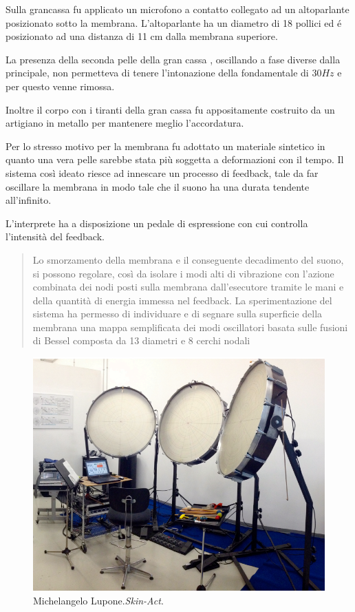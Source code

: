 Sulla grancassa fu applicato un microfono a contatto collegato ad un altoparlante
posizionato sotto la membrana.
L’altoparlante ha un diametro di 18 pollici ed é posizionato ad una distanza di
11 cm dalla membrana superiore.

La presenza della seconda pelle della gran cassa , oscillando a fase diverse
dalla principale, non permetteva di tenere l’intonazione della fondamentale di
$30Hz$ e per questo venne rimossa.

Inoltre il corpo con i tiranti della gran cassa fu appositamente costruito da un
artigiano in metallo per mantenere meglio l’accordatura.

Per lo stresso motivo per la membrana fu adottato  un materiale sintetico in
quanto una vera pelle sarebbe stata più soggetta a deformazioni con il tempo.
Il sistema così ideato riesce ad innescare un processo di feedback, tale da far
oscillare la membrana in modo tale che il suono ha una durata tendente
all’infinito.

L’interprete ha a disposizione un pedale di espressione con cui controlla
l’intensità del feedback.

\begin{quote}
Lo smorzamento della membrana e il conseguente decadimento del suono, si possono
regolare, così da isolare i modi alti di vibrazione con l’azione combinata dei
nodi posti sulla membrana dall’esecutore tramite le mani e della quantità di
energia immessa nel feedback. La sperimentazione del sistema ha permesso di
individuare e di segnare sulla superficie della membrana una mappa semplificata
dei modi oscillatori basata sulle fusioni di Bessel composta da 13 diametri e
8 cerchi nodali
\end{quote}

\begin{figure}%
\centering
\includegraphics[width=0.99\columnwidth]{Graphics/foto/skin-act}
\caption[]{Michelangelo Lupone.\emph{Skin-Act}.}
\label{skinact}
\end{figure}


